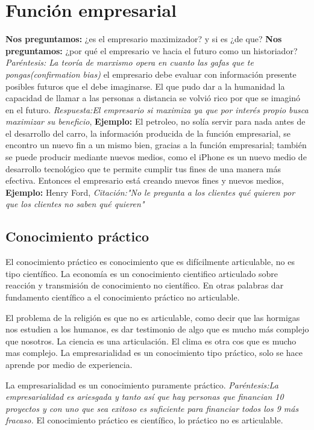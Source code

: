 \section{Función empresarial}
\textbf{Nos preguntamos:} ¿es el empresario maximizador? y si es ¿de que? \textbf{Nos preguntamos:} ¿por qué el empresario ve hacia el futuro como un historiador?
\emph{Paréntesis: La teoría de marxismo opera en cuanto las gafas que te pongas(confirmation bias)} el empresario debe evaluar con información presente posibles futuros que el debe imaginarse. El que pudo dar a la humanidad la capacidad de llamar a las personas a distancia se volvió rico por que se imaginó en el futuro. \newline 
\emph{Respuesta:El empresario si maximiza ya que por interés propio busca maximizar su beneficio}, \textbf{Ejemplo: } El petroleo, no solía servir para nada antes de el desarrollo del carro, la información producida de la función empresarial, se encontro un nuevo fin a un mismo bien, gracias a la función empresarial; también se puede producir mediante nuevos medios, como el iPhone es un nuevo medio de desarrollo tecnológico que te permite cumplir tus fines de una manera más efectiva. \newline \newline 
Entonces el empresario está creando nuevos fines y nuevos medios, \textbf{Ejemplo: } Henry Ford, \emph{Citación:"No le pregunta a los clientes qué quieren por que los clientes no saben qué quieren"}

\subsection{Conocimiento práctico}
El conocimiento práctico es conocimiento que es difícilmente articulable, no es tipo científico. La economía es un conocimiento cientifico articulado sobre reacción y transmisión de conocimiento no científico. En otras palabras dar fundamento científico a el conocimiento práctico no articulable.\newline

El problema de la religión es que no es articulable, como decir que las hormigas nos estudien a los humanos, es dar testimonio de algo que es mucho más complejo que nosotros. La ciencia es una articulación. El clima es otra cos que es mucho mas complejo. La empresarialidad es un conocimiento tipo práctico, solo se hace aprende por medio de experiencia.\newline 

La empresarialidad es un conocimiento puramente práctico. \emph{Paréntesis:La empresarialidad es ariesgada y tanto así que hay personas que financian 10 proyectos y con uno que sea exitoso es suficiente para financiar todos los 9 más fracaso.} El conocimiento práctico es científico, lo práctico no es articulable.

